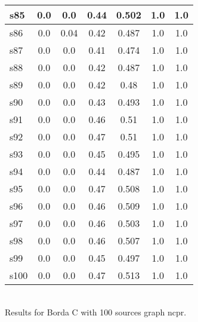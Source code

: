 \documentclass{article}
\begin{document}
\begin{tabular}{|l|c|c|c|c|c|c|}
\hline
s85 &0.0 & 0.0 & 0.44 & 0.502 & 1.0 & 1.0\\
\hline
s86 &0.0 & 0.04 & 0.42 & 0.487 & 1.0 & 1.0\\
\hline
s87 &0.0 & 0.0 & 0.41 & 0.474 & 1.0 & 1.0\\
\hline
s88 &0.0 & 0.0 & 0.42 & 0.487 & 1.0 & 1.0\\
\hline
s89 &0.0 & 0.0 & 0.42 & 0.48 & 1.0 & 1.0\\
\hline
s90 &0.0 & 0.0 & 0.43 & 0.493 & 1.0 & 1.0\\
\hline
s91 &0.0 & 0.0 & 0.46 & 0.51 & 1.0 & 1.0\\
\hline
s92 &0.0 & 0.0 & 0.47 & 0.51 & 1.0 & 1.0\\
\hline
s93 &0.0 & 0.0 & 0.45 & 0.495 & 1.0 & 1.0\\
\hline
s94 &0.0 & 0.0 & 0.44 & 0.487 & 1.0 & 1.0\\
\hline
s95 &0.0 & 0.0 & 0.47 & 0.508 & 1.0 & 1.0\\
\hline
s96 &0.0 & 0.0 & 0.46 & 0.509 & 1.0 & 1.0\\
\hline
s97 &0.0 & 0.0 & 0.46 & 0.503 & 1.0 & 1.0\\
\hline
s98 &0.0 & 0.0 & 0.46 & 0.507 & 1.0 & 1.0\\
\hline
s99 &0.0 & 0.0 & 0.45 & 0.497 & 1.0 & 1.0\\
\hline
s100 &0.0 & 0.0 & 0.47 & 0.513 & 1.0 & 1.0\\
\hline
\end{tabular}\\

\noindent Results for Borda C with 100 sources graph ncpr.
\end{document}
